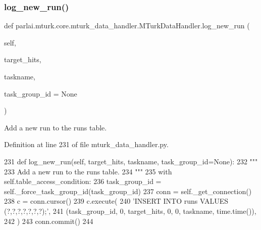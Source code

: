 \subsubsection{\texorpdfstring{log\+\_\+new\+\_\+run()}{log\_new\_run()}}
{\footnotesize\ttfamily def parlai.\+mturk.\+core.\+mturk\+\_\+data\+\_\+handler.\+M\+Turk\+Data\+Handler.\+log\+\_\+new\+\_\+run (\begin{DoxyParamCaption}\item[{}]{self,  }\item[{}]{target\+\_\+hits,  }\item[{}]{taskname,  }\item[{}]{task\+\_\+group\+\_\+id = {\ttfamily None} }\end{DoxyParamCaption})}

\begin{DoxyVerb}Add a new run to the runs table.
\end{DoxyVerb}
 

Definition at line 231 of file mturk\+\_\+data\+\_\+handler.\+py.


\begin{DoxyCode}
231     \textcolor{keyword}{def }log\_new\_run(self, target\_hits, taskname, task\_group\_id=None):
232         \textcolor{stringliteral}{"""}
233 \textcolor{stringliteral}{        Add a new run to the runs table.}
234 \textcolor{stringliteral}{        """}
235         with self.table\_access\_condition:
236             task\_group\_id = self.\_force\_task\_group\_id(task\_group\_id)
237             conn = self.\_get\_connection()
238             c = conn.cursor()
239             c.execute(
240                 \textcolor{stringliteral}{'INSERT INTO runs VALUES (?,?,?,?,?,?,?);'},
241                 (task\_group\_id, 0, target\_hits, 0, 0, taskname, time.time()),
242             )
243             conn.commit()
244 
\end{DoxyCode}
\mbox{\label{classparlai_1_1mturk_1_1core_1_1mturk__data__handler_1_1MTurkDataHandler_a8924cb67f6d2e884091eadc0235dd209}} 
